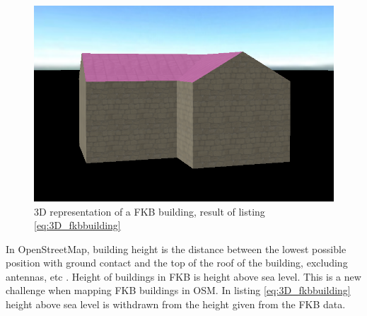 \begin{figure}[H]
    \centering
    \includegraphics[scale=0.5]{figures/FixedByMe/3DFKBbuilding.png}
    \caption{3D representation of a FKB building, result of listing \ref{eq:3D_fkbbuilding}}
    \label{fig:3DFKBbuild}
\end{figure}

In OpenStreetMap, building height is the distance between the lowest possible position with ground contact and the top of the roof of the building, excluding antennas, etc \cite{OSMwikipage2016}. Height of buildings in FKB is height above sea level. This is a new challenge when mapping FKB buildings in OSM. In listing \ref{eq:3D_fkbbuilding} height above sea level is withdrawn from the height given from the FKB data. 


